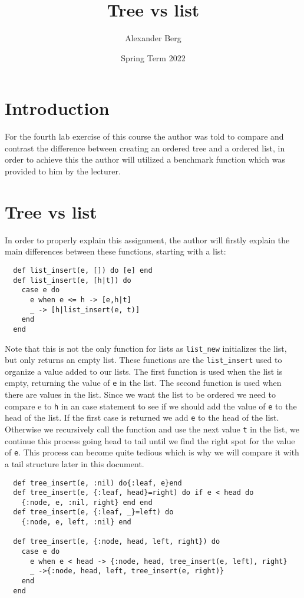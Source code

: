 \documentclass[a4paper,11pt]{article}
\begin{document}
\title{
    \textbf{Tree vs list}
}
\author{Alexander Berg}
\date{Spring Term 2022}

\maketitle

\section*{Introduction}

For the fourth lab exercise of this course the author was told to compare and contrast the difference between creating an ordered tree and a ordered list, in order to achieve this the author will utilized a benchmark function which was provided to him by the lecturer. 

\section*{Tree vs list}

In order to properly explain this assignment, the author will firstly explain the main differences between these functions, starting with a list:

\begin{verbatim}
  def list_insert(e, []) do [e] end
  def list_insert(e, [h|t]) do
    case e do
      e when e <= h -> [e,h|t]
      _ -> [h|list_insert(e, t)]
    end
  end
\end{verbatim}

Note that this is not the only function for lists as {\tt list\_new} initializes the list, but only returns an empty list. 
These functions are the {\tt list\_insert} used to organize a value added to our lists. The first function is used when the list is empty, returning the value of {\tt e} in the list. The second function is used when there are values in the list. Since we want the list to be ordered we need to compare e to {\tt h} in an case statement to see if we should add the value of {\tt e} to the head of the list. If the first case is returned we add {\tt e} to the head of the list. Otherwise we recursively call the function and use the next value {\tt t} in the list, we continue this process going head to tail until we find the right spot for the value of {\tt e}. This process can become quite tedious which is why we will compare it with a tail structure later in this document.

\begin{verbatim}
  def tree_insert(e, :nil) do{:leaf, e}end
  def tree_insert(e, {:leaf, head}=right) do if e < head do
    {:node, e, :nil, right} end end
  def tree_insert(e, {:leaf, _}=left) do
    {:node, e, left, :nil} end

  def tree_insert(e, {:node, head, left, right}) do
    case e do
      e when e < head -> {:node, head, tree_insert(e, left), right}
      _ ->{:node, head, left, tree_insert(e, right)}
    end
  end


\end{verbatim}
\end{document}
